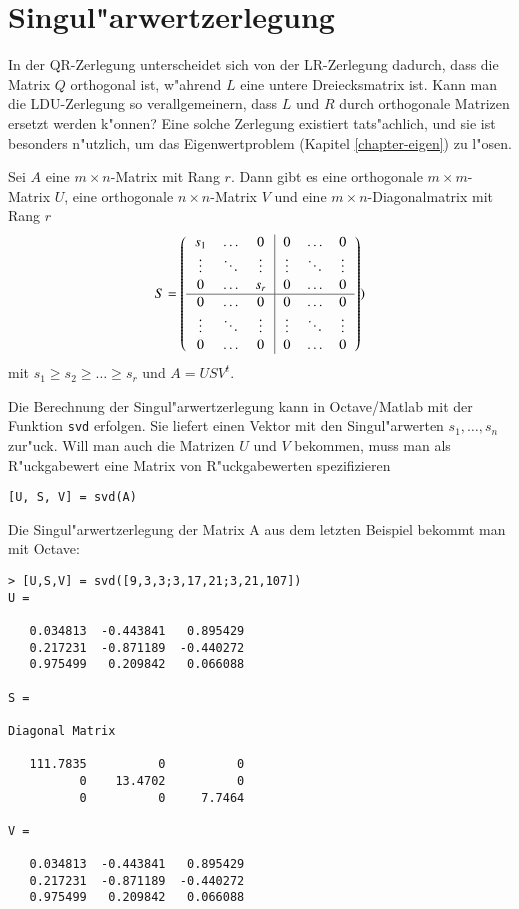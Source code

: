 \section{Singul"arwertzerlegung\label{section-svd}}
In der QR-Zerlegung unterscheidet sich von der LR-Zerlegung
dadurch, dass die Matrix $Q$ orthogonal ist, w"ahrend $L$ eine
untere Dreiecksmatrix ist.
Kann man die LDU-Zerlegung so verallgemeinern,
dass $L$ und $R$ durch orthogonale Matrizen ersetzt
werden k"onnen?  Eine solche Zerlegung existiert tats"achlich,
und sie ist besonders n"utzlich, um das Eigenwertproblem
(Kapitel \ref{chapter-eigen}) zu l"osen.

\begin{satz}\label{satz-svd}
Sei $A$ eine $m\times n$-Matrix mit Rang $r$.
Dann gibt es eine orthogonale $m\times m$-Matrix $U$, eine
orthogonale $n\times n$-Matrix $V$ und eine $m\times n$-Diagonalmatrix
mit Rang $r$ 
\begin{equation}
S=\left(
\begin{tabular}{>{$}c<{$}>{$}c<{$}>{$}c<{$}|>{$}c<{$}>{$}c<{$}>{$}c<{$}}
s_1   &\dots &0     &0     &\dots &0\\
\vdots&\ddots&\vdots&\vdots&\ddots&\vdots\\
0     &\dots &s_r   &0     &\dots &0\\
\hline
0     &\dots &0     &0     &\dots &0\\
\vdots&\ddots&\vdots&\vdots&\ddots&\vdots\\
0     &\dots &0     &0     &\dots &0\\
\end{tabular}
\right)
\label{s-matrix})
\end{equation}
mit $s_1\ge s_2\ge\dots \ge s_r$ und $A=USV^t$.
\end{satz}

Die Berechnung der Singul"arwertzerlegung kann in Octave/Matlab
mit der Funktion {\tt svd} erfolgen.
Sie liefert einen Vektor mit den Singul"arwerten $s_1,\dots,s_n$ zur"uck.
Will man auch die Matrizen $U$ und $V$ bekommen, muss man als R"uckgabewert
eine Matrix von R"uckgabewerten spezifizieren
\begin{verbatim}
[U, S, V] = svd(A)
\end{verbatim}

\begin{beispiel}
Die Singul"arwertzerlegung der Matrix A aus dem letzten Beispiel 
bekommt man mit Octave:
\begin{verbatim}
> [U,S,V] = svd([9,3,3;3,17,21;3,21,107])
U =

   0.034813  -0.443841   0.895429
   0.217231  -0.871189  -0.440272
   0.975499   0.209842   0.066088

S =

Diagonal Matrix

   111.7835          0          0
          0    13.4702          0
          0          0     7.7464

V =

   0.034813  -0.443841   0.895429
   0.217231  -0.871189  -0.440272
   0.975499   0.209842   0.066088
\end{verbatim}
\end{beispiel}
